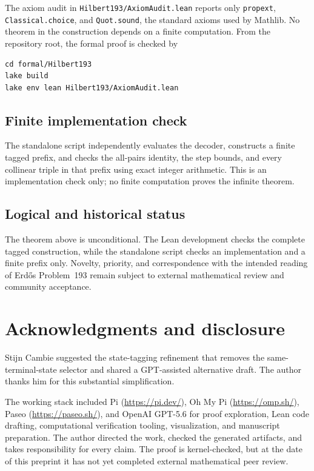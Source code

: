 \documentclass[11pt]{article}
\theoremstyle{definition}
\theoremstyle{remark}
\begin{document}
The axiom audit in \texttt{Hilbert193/AxiomAudit.lean} reports only
\texttt{propext}, \texttt{Classical.choice}, and \texttt{Quot.sound}, the
standard axioms used by Mathlib.  No theorem in the construction depends on a
finite computation.  From the repository root, the formal proof is checked by
\begin{verbatim}
cd formal/Hilbert193
lake build
lake env lean Hilbert193/AxiomAudit.lean
\end{verbatim}

\subsection{Finite implementation check}

The standalone script
 independently evaluates the decoder,
constructs a finite tagged prefix, and checks the all-pairs identity, the
step bounds, and every collinear triple in that prefix using exact integer
arithmetic.  This is an implementation check only; no finite computation
proves the infinite theorem.

\subsection{Logical and historical status}

The theorem above is unconditional.  The Lean development checks the complete
tagged construction, while the standalone script checks an implementation
and a finite prefix only.
Novelty, priority, and correspondence with the intended
reading of Erd\H{o}s Problem~193 remain subject to external mathematical
review and community acceptance.

\section*{Acknowledgments and disclosure}

Stijn Cambie suggested the state-tagging refinement that removes the
same-terminal-state selector and shared a GPT-assisted alternative draft.
The author thanks him for this substantial simplification.

The working stack included Pi (\url{https://pi.dev/}), Oh My Pi
(\url{https://omp.sh/}), Paseo (\url{https://paseo.sh/}), and OpenAI GPT-5.6
for proof exploration, Lean code drafting, computational verification tooling,
visualization, and manuscript preparation.
The author directed the work, checked the generated artifacts, and takes
responsibility for every claim.  The proof is kernel-checked, but at the date
of this preprint it has not yet completed external mathematical peer review.
\end{document}
